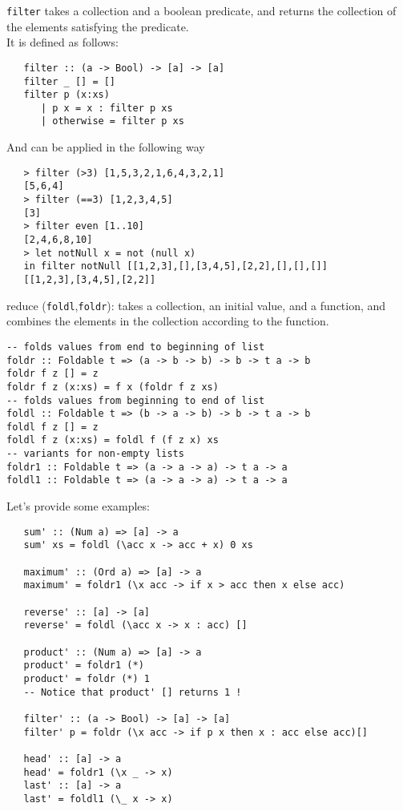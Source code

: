 \lstinline|filter| takes a collection and a boolean predicate, and
returns the collection of the elements satisfying the
predicate.\\
It is defined as follows:
\begin{lstlisting}
   filter :: (a -> Bool) -> [a] -> [a]
   filter _ [] = []
   filter p (x:xs)
      | p x = x : filter p xs
      | otherwise = filter p xs
\end{lstlisting}
And can be applied in the following way
\begin{lstlisting}
   > filter (>3) [1,5,3,2,1,6,4,3,2,1]
   [5,6,4]
   > filter (==3) [1,2,3,4,5]
   [3]
   > filter even [1..10]
   [2,4,6,8,10]
   > let notNull x = not (null x)
   in filter notNull [[1,2,3],[],[3,4,5],[2,2],[],[],[]]
   [[1,2,3],[3,4,5],[2,2]]
\end{lstlisting}

reduce (\lstinline|foldl|,\lstinline|foldr|): takes a collection, an initial value,
and a function, and combines the elements in the
collection according to the function.

\begin{lstlisting}
-- folds values from end to beginning of list
foldr :: Foldable t => (a -> b -> b) -> b -> t a -> b
foldr f z [] = z
foldr f z (x:xs) = f x (foldr f z xs)
-- folds values from beginning to end of list
foldl :: Foldable t => (b -> a -> b) -> b -> t a -> b
foldl f z [] = z
foldl f z (x:xs) = foldl f (f z x) xs
-- variants for non-empty lists
foldr1 :: Foldable t => (a -> a -> a) -> t a -> a
foldl1 :: Foldable t => (a -> a -> a) -> t a -> a
\end{lstlisting}

Let's provide some examples:
\begin{lstlisting}
   sum' :: (Num a) => [a] -> a
   sum' xs = foldl (\acc x -> acc + x) 0 xs
   
   maximum' :: (Ord a) => [a] -> a
   maximum' = foldr1 (\x acc -> if x > acc then x else acc)
   
   reverse' :: [a] -> [a]
   reverse' = foldl (\acc x -> x : acc) []
   
   product' :: (Num a) => [a] -> a
   product' = foldr1 (*)
   product' = foldr (*) 1
   -- Notice that product' [] returns 1 !

   filter' :: (a -> Bool) -> [a] -> [a]
   filter' p = foldr (\x acc -> if p x then x : acc else acc)[]
   
   head' :: [a] -> a
   head' = foldr1 (\x _ -> x)
   last' :: [a] -> a
   last' = foldl1 (\_ x -> x)
\end{lstlisting}

